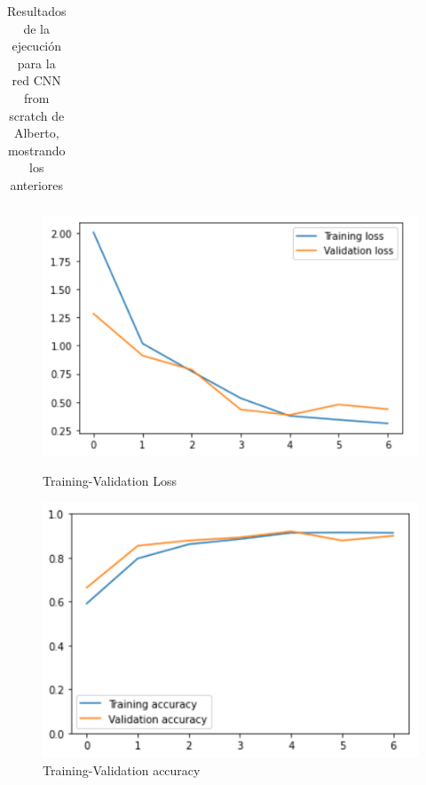 \documentclass[11pt,a4paper]{article}
\theoremstyle{definition}
\begin{document}
\begin{table}[H]
\begin{tabular}{|c|c|c|c|c|c|c|}
\end{tabular}
\caption{Resultados de la ejecución para la red CNN from scratch de Alberto, mostrando los anteriores}
\end{table}


\begin{figure}[H]
  \centering
  \begin{minipage}[b]{0.45\textwidth}
    \includegraphics[scale=0.75]{./images/albertoloss}
	\caption{Training-Validation Loss}
  \end{minipage}
  \hfill
  \begin{minipage}[b]{0.45\textwidth}
    \includegraphics[scale=0.75]{./images/albertoacc}
	\caption{Training-Validation accuracy}
  \end{minipage}
\end{figure}
\end{document}
